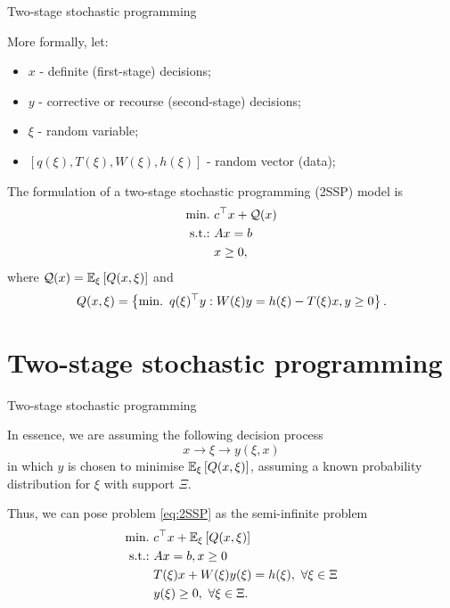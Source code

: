 \begin{frame}{Two-stage stochastic programming}

	More formally, let:
	\vspace{-6pt}
	\begin{itemize}
		\item $x$ - definite (first-stage) decisions; 
		\item $y$ - corrective or recourse (second-stage) decisions;
		\item $\xi$ - \alert{random} variable;
		\item $[q(\xi), T(\xi), W(\xi), h(\xi)]$ - random vector (data);  	
	\end{itemize}
	
	\pause
	The formulation of a \alert{two-stage stochastic programming (2SSP)} model is
	\begin{subequations} \label{eq:2SSP}
		\begin{align}
			\mathop{\text{min.} \ } & c^\top x + \mathcal{Q}(x) \\
			\mathop{\text{s.t.:} \ }  & Ax = b \\
			     & x \ge 0, 
		\end{align}
	\end{subequations}
	where $\mathcal{Q}(x) = \mathbb{E}_\xi\left[ Q(x, \xi) \right]$ and
	\begin{equation} \label{eq:2stage}
		Q(x, \xi) = \left\{ \mathop{\text{min.} \ } q(\xi)^\top y : W(\xi)y = h(\xi) - T(\xi)x, y \ge 0 \right \}.
	\end{equation}

\end{frame}


\section{Two-stage stochastic programming}


\begin{frame}{Two-stage stochastic programming}

	In essence, we are assuming the following \alert{decision process}
	$$
	 x \rightarrow \xi \rightarrow y(\xi, x)
	$$	
	in which $y$ is chosen to minimise $\mathbb{E}_\xi\left[ Q(x, \xi) \right]$, assuming a \alert{known probability distribution} for $\xi$ with support $\Xi$.
	
	\pause
	Thus, we can pose problem \eqref{eq:2SSP} as the \alert{semi-infinite} problem
	\begin{subequations} \label{eq:2SSP_2}
	\begin{align}
		\mathop{\text{min.} \ }  & c^\top x + \mathbb{E}_\xi\left[ Q(x, \xi) \right] \\
		\mathop{\text{s.t.:} \ }	   & Ax = b, x \ge 0 \\
			   & T(\xi)x + W(\xi)y(\xi) = h(\xi), \ \forall \xi \in \Xi \\
			   & y(\xi) \ge 0, \ \forall \xi \in \Xi.
	\end{align}
	\end{subequations}

\end{frame}


